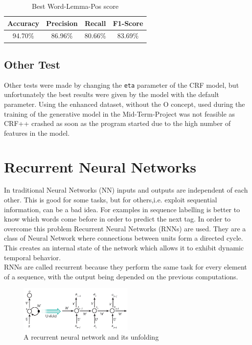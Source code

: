 \documentclass[11pt,a4paper]{article}
\begin{document}
\begin{table}[H]
    \begin{center}
        \begin{tabular}{|c|c|c|c|}
            \hline \bf Accuracy &   \bf Precision &  \bf Recall &  \bf F1-Score   \\ \hline
            94.70\% & 86.96\% & 80.66\% & 83.69\%\\
            \hline
        \end{tabular}
    \end{center}
    \caption{\label{t10} Best Word-Lemma-Pos score}
\end{table}

\subsection{Other Test}
Other tests were made by changing the \texttt{eta} parameter of the CRF model, but unfortunately the best results were given by the model with the default parameter. Using the enhanced dataset, without the O concept, used during the training of the generative model in the Mid-Term-Project was not feasible as CRF++ crashed as soon as the program started due to the high number of features in the model.
\section{Recurrent Neural Networks}
\label{sec:RNN}
In traditional Neural Networks (NN) inputs and outputs are independent of each other. This is good for some tasks, but for others,i.e. exploit sequential information, can be a bad idea. For examples in sequence labelling is better to know which words come before in order to predict the next tag. In order to overcome this problem Recurrent Neural Networks (RNNs) are used. They are a class of Neural Network where connections between units form a directed cycle. This creates an internal state of the network which allows it to exhibit dynamic temporal behavior.\\
RNNs are called recurrent because they perform the same task for every element of a sequence, with the output being depended on the previous computations.

\begin{figure}[h]
    \centering
    \includegraphics[width=0.5\textwidth]{rnn.png}
    \caption{A recurrent neural network and its unfolding}
    \label{RNNExample}
\end{figure}
\end{document}
